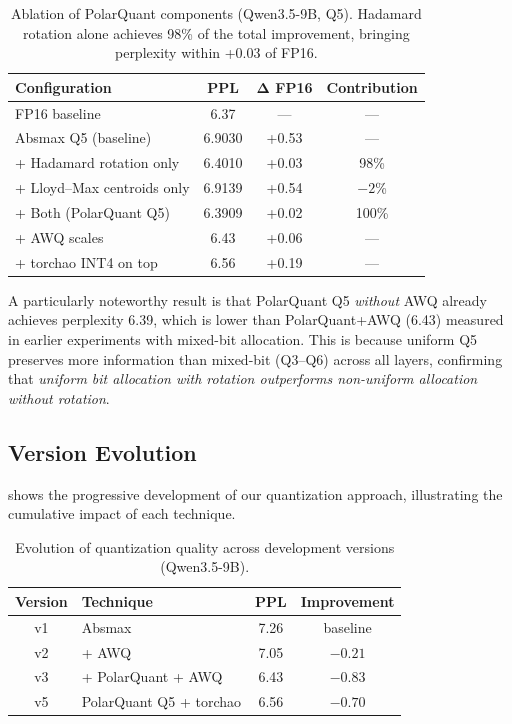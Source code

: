 \documentclass[10pt,twocolumn]{article}
\begin{document}
\begin{table}[t]
\centering
\caption{Ablation of PolarQuant components (Qwen3.5-9B, Q5). Hadamard rotation alone achieves 98\% of the total improvement, bringing perplexity within +0.03 of FP16.}
\label{tab:ablation}
\small
\begin{tabular}{@{}lccc@{}}
\toprule
\textbf{Configuration} & \textbf{PPL} & $\bm{\Delta}$ \textbf{FP16} & \textbf{Contribution} \\
\midrule
FP16 baseline & 6.37 & --- & --- \\
\midrule
Absmax Q5 (baseline) & 6.9030 & +0.53 & --- \\
+ Hadamard rotation only & 6.4010 & +0.03 & 98\% \\
+ Lloyd--Max centroids only & 6.9139 & +0.54 & $-2$\% \\
+ Both (PolarQuant Q5) & 6.3909 & +0.02 & 100\% \\
\midrule
+ AWQ scales & 6.43 & +0.06 & --- \\
+ torchao INT4 on top & 6.56 & +0.19 & --- \\
\bottomrule
\end{tabular}
\end{table}

A particularly noteworthy result is that PolarQuant Q5 \emph{without} AWQ already achieves perplexity 6.39, which is lower than PolarQuant+AWQ (6.43) measured in earlier experiments with mixed-bit allocation. This is because uniform Q5 preserves more information than mixed-bit (Q3--Q6) across all layers, confirming that \emph{uniform bit allocation with rotation outperforms non-uniform allocation without rotation}.

\subsection{Version Evolution}
\label{sec:evolution}

 shows the progressive development of our quantization approach, illustrating the cumulative impact of each technique.

\begin{table}[t]
\centering
\caption{Evolution of quantization quality across development versions (Qwen3.5-9B).}
\label{tab:evolution}
\small
\begin{tabular}{@{}clcc@{}}
\toprule
\textbf{Version} & \textbf{Technique} & \textbf{PPL} & \textbf{Improvement} \\
\midrule
v1 & Absmax & 7.26 & baseline \\
v2 & + AWQ & 7.05 & $-0.21$ \\
v3 & + PolarQuant + AWQ & 6.43 & $-0.83$ \\
v5 & PolarQuant Q5 + torchao & 6.56 & $-0.70$ \\
\bottomrule
\end{tabular}
\end{table}
\end{document}
